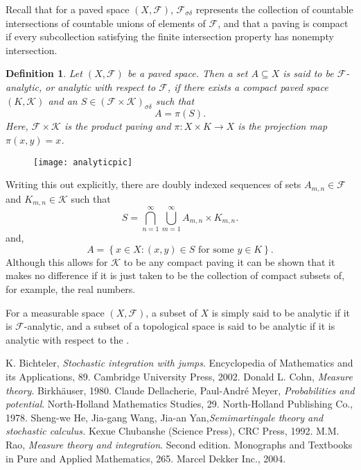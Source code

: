 \documentclass[12pt]{article}
\newtheorem*{definition*}{Definition}
\begin{document}
Recall that for a paved space $(X,\mathcal{F})$, $\mathcal{F}_{\sigma\delta}$ represents the collection of countable intersections of countable unions of elements of $\mathcal{F}$, and that a paving is compact if every subcollection satisfying the finite intersection property has nonempty intersection.

\begin{definition*}
Let $(X,\mathcal{F})$ be a paved space. Then a set $A\subseteq X$ is said to be $\mathcal{F}$-\emph{analytic}, or \emph{analytic with respect to} $\mathcal{F}$, if there exists a compact paved space $(K,\mathcal{K})$ and an $S\in(\mathcal{F}\times\mathcal{K})_{\sigma\delta}$ such that
\begin{equation*}
A=\pi(S).
\end{equation*}
Here, $\mathcal{F}\times\mathcal{K}$ is the product paving and $\pi\colon X\times K\rightarrow X$ is the projection map $\pi(x,y)=x$.
\end{definition*}

\begin{figure}[H]
\centering
\texttt{[image: analyticpic]}
\end{figure}

Writing this out explicitly, there are doubly indexed sequences of sets $A_{m,n}\in\mathcal{F}$ and $K_{m,n}\in\mathcal{K}$ such that
\begin{equation*}
S = \bigcap_{n=1}^\infty\bigcup_{m=1}^\infty A_{m,n}\times K_{m,n}.
\end{equation*}
and,
\begin{equation*}
A=\left\{x\in X\colon (x,y)\in S\text{ for some }y\in K\right\}.
\end{equation*}
Although this allows for $\mathcal{K}$ to be any compact paving it can be shown that it makes no difference if it is just taken to be the collection of compact subsets of, for example, the real numbers.

For a measurable space $(X,\mathcal{F})$, a subset of $X$ is simply said to be analytic if it is $\mathcal{F}$-analytic, and a subset of a topological space is said to be analytic if it is analytic with respect to the .


\begin{thebibliography}{9}
K. Bichteler, \emph{Stochastic integration with jumps}. Encyclopedia of Mathematics and its Applications, 89. Cambridge University Press, 2002.
Donald L. Cohn, \emph{Measure theory}. Birkh\"auser, 1980.
Claude Dellacherie, Paul-Andr\'e Meyer, \emph{Probabilities and potential}. North-Holland Mathematics Studies, 29. North-Holland Publishing Co., 1978.
Sheng-we He, Jia-gang Wang, Jia-an Yan,\emph{Semimartingale theory and stochastic calculus.} Kexue Chubanshe (Science Press), CRC Press, 1992.
M.M. Rao, \emph{Measure theory and integration}. Second edition. Monographs and Textbooks in Pure and Applied Mathematics, 265. Marcel Dekker Inc., 2004.
\end{thebibliography}

\end{document}
